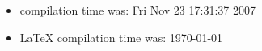 \documentclass{article}
\begin{document}
\begin{itemize}
  \item \Rlogo{} compilation time was: Fri Nov 23 17:31:37 2007
  \item \LaTeX{} compilation time was: \today
\end{itemize}


\clearpage
{}


\end{document}
